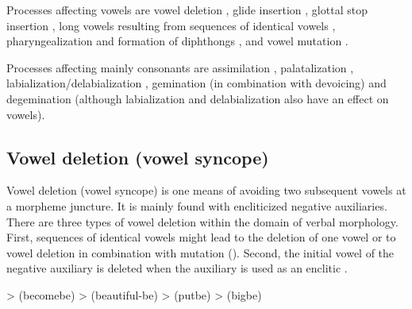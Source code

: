 Processes affecting vowels are vowel deletion , glide insertion , glottal stop insertion , long vowels resulting from sequences of identical vowels , pharyngealization and formation of diphthongs , and vowel mutation .

Processes affecting mainly consonants are assimilation , palatalization , labialization\slash delabialization , gemination (in combination with devoicing) and degemination  (although labialization and delabialization also have an effect on vowels).



\subsection{Vowel deletion (vowel syncope)}
\label{ssec:Vowel deletion (vowel syncope)}

Vowel deletion (vowel syncope) is one means of avoiding two subsequent vowels at a morpheme juncture. It is mainly found with encliticized negative auxiliaries. There are three types of vowel deletion within the domain of verbal morphology. First, sequences of identical vowels might lead to the deletion of one vowel or to vowel deletion in combination with mutation (). Second, the initial vowel of the negative auxiliary is deleted when the auxiliary is used as an enclitic .
%
\begin{exe}
	\ex	\label{ex:vowel syncope verbs phon}
	\begin{xlist}
		\ex	{} >  (becomebe)			
		\ex	{} >  (beautiful-be)		
		\ex	{} > \newline\hspace*{1em}(putbe) 
		\ex	{} >  (bigbe)
	\end{xlist}
\end{exe}

